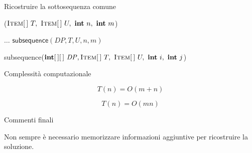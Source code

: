 \begin{frame}[shrink=10]{Ricostruire la sottosequenza comune}

\vspace{-9pt}
\begin{Procedure}
\caption[A]{\INTEGER \LCS($\Item[\,]\ T,\ \Item[\,]\ U,\ \INTEGER\ n,\ \INTEGER\ m$)}
  $\ldots$\;
  \Return $\textsf{subsequence}(\mathit{DP}, T, U, n, m)$\;
\end{Procedure}

\vspace{-18pt}
\begin{Procedure}
\caption[A]{\textsf{subsequence}($\INTEGER[\,][\,]\ \mathit{DP}, \Item[\,]\ T,\ \Item[\,]\ U,\ \INTEGER\ i,\ \INTEGER\ j$)}
\end{Procedure}


\end{frame}

\begin{frame}{Complessità computazionale}

\vspace{-9pt}

\pause
\[
  T(n) = O(m+n)
\]
  
\bigskip
{}

\pause
\[
  T(n) = O(mn)
\]

\end{frame}

\begin{frame}{Commenti finali}

\vspace{-9pt}
\begin{myboxtitle}
Non sempre è necessario memorizzare informazioni aggiuntive per ricostruire la soluzione.
\end{myboxtitle}

\end{frame}

